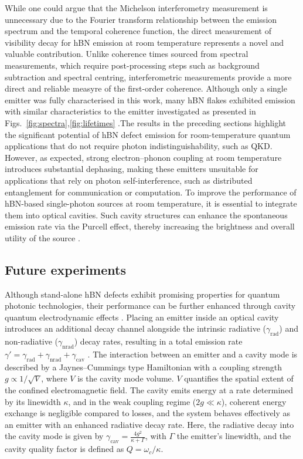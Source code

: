 While one could argue that the Michelson interferometry measurement is unnecessary due to the Fourier transform relationship between the emission spectrum and the temporal coherence function, the direct measurement of visibility decay for hBN emission at room temperature represents a novel and valuable contribution. Unlike coherence times sourced from spectral measurements, which require post-processing steps such as background subtraction and spectral centring, interferometric measurements provide a more direct and reliable measyre of the first-order coherence. Although only a single emitter was fully characterised in this work, many hBN flakes exhibited emission with similar characteristics to the emitter investigated as presented in Figs.~\ref{fig:spectra},\ref{fig:lifetimes} .The results in the preceding sections highlight the significant potential of hBN defect emission for room-temperature quantum applications that do not require photon indistinguishability, such as QKD. However, as expected, strong electron–phonon coupling at room temperature introduces substantial dephasing, making these emitters unsuitable for applications that rely on photon self-interference, such as distributed entanglement for communication or computation. To improve the performance of hBN-based single-photon sources at room temperature, it is essential to integrate them into optical cavities. Such cavity structures can enhance the spontaneous emission rate via the Purcell effect, thereby increasing the brightness and overall utility of the source \cite{Nonahal2023}.

\subsection{Future experiments}

Although stand-alone hBN defects exhibit promising properties for quantum photonic technologies, their performance can be further enhanced through cavity quantum electrodynamic effects \cite{Kimble1998}. Placing an emitter inside an optical cavity introduces an additional decay channel alongside the intrinsic radiative ($\gamma_{\text{rad}}$) and non-radiative ($\gamma_{\text{nrad}}$) decay rates, resulting in a total emission rate $\gamma' = \gamma_{\text{rad}} + \gamma_{\text{nrad}} + \gamma_{\text{cav}}$ \cite{Auffeves2010}. The interaction between an emitter and a cavity mode is described by a Jaynes–Cummings type Hamiltonian with a coupling strength $g \propto 1/\sqrt{V}$, where $V$ is the cavity mode volume. $V$ quantifies the spatial extent of the confined electromagnetic field. The cavity emits energy at a rate determined by its linewidth $\kappa$, and in the weak coupling regime ($2g \ll \kappa$), coherent energy exchange is negligible compared to losses, and the system behaves effectively as an emitter with an enhanced radiative decay rate. Here, the radiative decay into the cavity mode is given by $\gamma_{\text{cav}} = \frac{4g^2}{\kappa + \Gamma}$, with $\Gamma$ the emitter's linewidth, and the cavity quality factor is defined as $Q = \omega_c/\kappa$.

